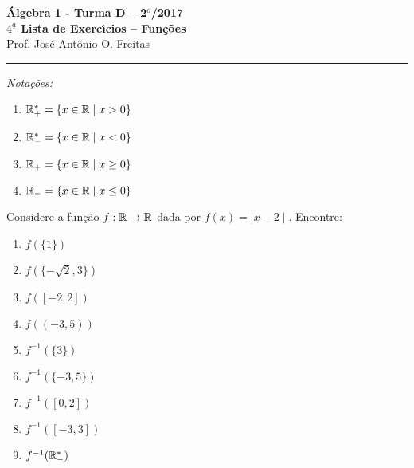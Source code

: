 \documentclass[12pt]{article}
\begin{document}


\begin{center}
{\Large\bf {\'A}lgebra 1 - Turma D -- 2$^{o}$/2017} \\ \vspace{9pt} {\large\bf
  $4^{\underline{a}}$ Lista de Exerc{\'\i}cios -- Funções}\\
\vspace{9pt} Prof. Jos{\'e} Ant{\^o}nio O. Freitas
\end{center}
\hrule

\vspace{.6cm}

\begin{center}
	\textit{Notações:}
\end{center}
\begin{multicols}{2}
	\begin{enumerate}[label={\roman*})]
		\item $\mathbb{R}^*_+ = \{x \in \mathbb{R} \mid x > 0\}$
		\item $\mathbb{R}^*_- = \{x \in \mathbb{R} \mid x < 0\}$
		\item $\mathbb{R}_+ = \{x \in \mathbb{R} \mid x \ge 0\}$
		\item $\mathbb{R}_- = \{x \in \mathbb{R} \mid x \le 0\}$
	\end{enumerate}
\end{multicols}

\vspace{.6cm}

\questao Considere a função $f : \mathbb{R} \to \mathbb{R}$ dada por $f(x) = \mid x - 2\mid$. Encontre:
\begin{multicols}{3}
	\begin{enumerate}[label={\alph*})]
		\item $f(\{1\})$
		\item $f(\{-\sqrt{2}, 3\})$
		\item $f([-2,2])$
		\item $f((-3,5))$
		\item $f^{-1}(\{3\})$
		\item $f^{-1}(\{-3,5\})$
		\item $f^{-1}([0,2])$
		\item $f^{-1}([-3,3])$
		\item $f^{-1}(\mathbb{R}^*_-)$
	\end{enumerate}
\end{multicols}

\vesp
\end{document}
